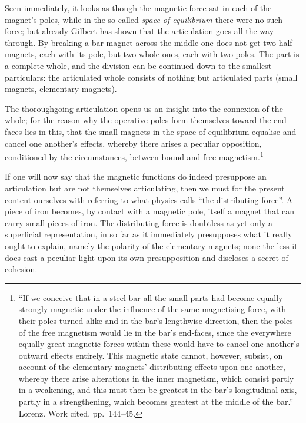 \documentclass[12pt,a4paper]{book}
\begin{document}
Seen immediately, it looks as though the magnetic force sat in each of the magnet's poles, while in the so-called
\emph{space of equilibrium} there were no such force; but already Gilbert has shown that the articulation goes all the
way through. By breaking a bar magnet across the middle one does not get two half magnets, each with its pole, but two
whole ones, each with two poles. The part is a complete whole, and the division can be continued down to the smallest
particulars: the articulated whole consists of nothing but articulated parts (small magnets, elementary magnets).

The thoroughgoing articulation opens us an insight into the connexion of the whole; for the reason why the operative
poles form themselves toward the end-faces lies in this, that the small magnets in the space of equilibrium equalise and
cancel one another's effects, whereby there arises a peculiar opposition, conditioned by the circumstances, between bound
and free
magnetism.\footnote{%
``If we conceive that in a steel bar all the small parts had become equally strongly magnetic under the influence of the
same magnetising force, with their poles turned alike and in the bar's lengthwise direction, then the poles of the free
magnetism would lie in the bar's end-faces, since the everywhere equally great magnetic forces within these would have to
cancel one another's outward effects entirely. This magnetic state cannot, however, subsist, on account of the elementary
magnets' distributing effects upon one another, whereby there arise alterations in the inner magnetism, which consist
partly in a weakening, and this must then be greatest in the bar's longitudinal axis, partly in a strengthening, which
becomes greatest at the middle of the bar.''
Lorenz. Work cited. pp.\ 144--45.}

If one will now say that the magnetic functions do indeed presuppose an articulation but are not themselves articulating,
then we must for the present content ourselves with referring to what physics calls ``the distributing force''. A piece of
iron becomes, by contact with a magnetic pole, itself a magnet that can carry small pieces of iron. The distributing force
is doubtless as yet only a superficial representation, in so far as it immediately presupposes what it really ought to
explain, namely the polarity of the elementary magnets; none the less it does cast a peculiar light upon its own
presupposition and discloses a secret of cohesion.
\end{document}
